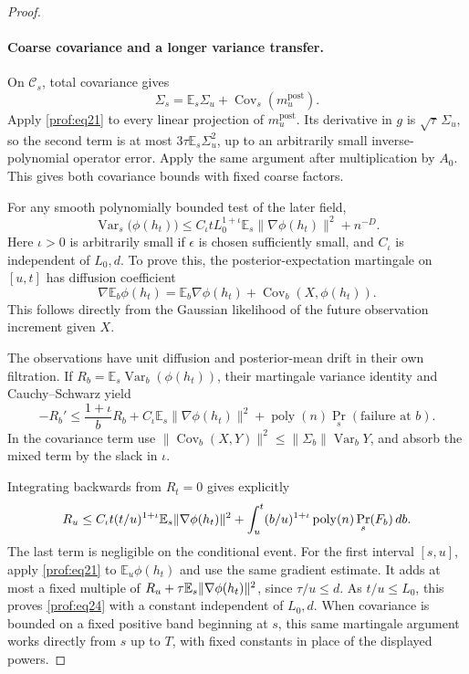 \begin{proof}
\paragraph{Coarse covariance and a longer variance transfer.}
On \(\mathcal C_s\), total covariance gives
\[
 \Sigma_s=\mathbb E_s\Sigma_u+
                  \operatorname{Cov}_s(m_u^{\mathrm{post}}).
\]
Apply \eqref{prof:eq21} to every linear projection of
\(m_u^{\mathrm{post}}\).  Its derivative in \(g\) is
\(\sqrt\tau\,\Sigma_u\), so the second term is at most
\(3\tau\mathbb E_s\Sigma_u^2\), up to an arbitrarily small
inverse-polynomial operator error.  Apply the same argument after
multiplication by \(A_0\).  This gives both covariance bounds with
fixed coarse factors.

For any smooth polynomially bounded test of the later field,
\begin{equation}
 \operatorname{Var}_s\bigl(\phi(h_t)\bigr)
 \le C_\iota tL_0^{1+\iota}
             \mathbb E_s\|\nabla\phi(h_t)\|^2+n^{-D}.
 \label{prof:eq24}
\end{equation}
Here \(\iota>0\) is arbitrarily small if \(\epsilon\) is chosen
sufficiently small, and \(C_\iota\) is independent of \(L_0,d\).
To prove this, the posterior-expectation martingale on \([u,t]\) has
diffusion coefficient
\[
 \nabla\mathbb E_b\phi(h_t)
  =\mathbb E_b\nabla\phi(h_t)
       +\operatorname{Cov}_b(X,\phi(h_t)).
\]
This follows directly from the Gaussian likelihood of the future
observation increment given \(X\).

The observations have unit
diffusion and posterior-mean drift in their own filtration.  If
\(R_b=\mathbb E_s\operatorname{Var}_b(\phi(h_t))\), their martingale
variance identity and Cauchy--Schwarz yield
\[
 -R_b'\le \frac{1+\iota}{b}R_b
       +C_\iota\mathbb E_s\|\nabla\phi(h_t)\|^2
       +\operatorname{poly}(n)\Pr_s(\text{failure at }b).
\]
In the covariance term use
\(\|\operatorname{Cov}_b(X,Y)\|^2\le
\|\Sigma_b\|\operatorname{Var}_bY\), and absorb the mixed term
by the slack in \(\iota\).

Integrating backwards from \(R_t=0\) gives explicitly
\[
 R_u\le C_\iota t(t/u)^{1+\iota}
       \mathbb E_s\|\nabla\phi(h_t)\|^2
   +\int_u^t (b/u)^{1+\iota}
       \operatorname{poly}(n)\Pr_s(F_b)\,db.
\]
The last term is negligible on the conditional event. For the first interval
\([s,u]\), apply \eqref{prof:eq21} to \(\mathbb E_u\phi(h_t)\)
and use the same gradient estimate. It adds at most a fixed multiple
of \(R_u+\tau\mathbb E_s\|\nabla\phi(h_t)\|^2\), since \(\tau/u\le d\).
As \(t/u\le L_0\), this proves \eqref{prof:eq24} with a constant
independent of \(L_0,d\).
When covariance is bounded on a fixed positive band beginning at \(s\),
this same martingale argument works directly from \(s\) up to \(T\),
with fixed constants in place of the displayed powers.


\end{proof}
